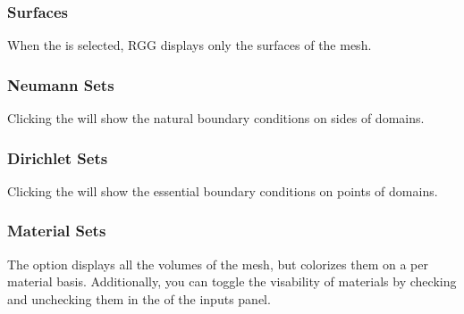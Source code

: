 \subsubsection{Surfaces}
When the  is selected, RGG displays only the surfaces of the mesh.

\subsubsection{Neumann Sets}
Clicking the  will show the natural boundary conditions on sides of domains.

\subsubsection{Dirichlet Sets}
Clicking the  will show the essential boundary conditions on points of domains.

\subsubsection{Material Sets}
The  option displays all the volumes of the mesh, but colorizes them on a per material basis.  Additionally, you can toggle the visability of materials by checking and unchecking them in the  of the inputs panel.